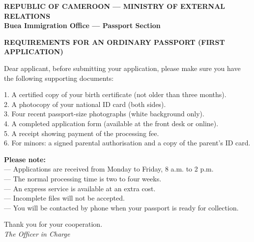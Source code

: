 \documentclass[11pt]{article}
\begin{document}
\begin{textebox}
\textbf{REPUBLIC OF CAMEROON — MINISTRY OF EXTERNAL RELATIONS}\\
\textbf{Buea Immigration Office — Passport Section}

\textbf{REQUIREMENTS FOR AN ORDINARY PASSPORT (FIRST APPLICATION)}

Dear applicant, before submitting your application, please make sure you have the following supporting documents:

1. A certified copy of your birth certificate (not older than three months).\\
2. A photocopy of your national ID card (both sides).\\
3. Four recent passport-size photographs (white background only).\\
4. A completed application form (available at the front desk or online).\\
5. A receipt showing payment of the processing fee.\\
6. For minors: a signed parental authorisation and a copy of the parent's ID card.

\textbf{Please note:}\\
— Applications are received from Monday to Friday, 8 a.m. to 2 p.m.\\
— The normal processing time is two to four weeks.\\
— An express service is available at an extra cost.\\
— Incomplete files will not be accepted.\\
— You will be contacted by phone when your passport is ready for collection.

Thank you for your cooperation.\\
\emph{The Officer in Charge}
\end{textebox}
\end{document}
